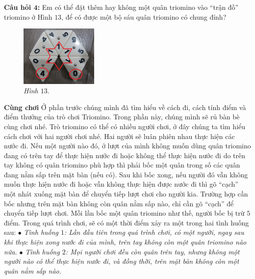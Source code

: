 {\begin{multicols}{2}
		\textbf{\color{toancuabi}Câu hỏi $\pmb{4}$:}
		\vskip 0.1cm
		Em có thể đặt thêm hay không một quân  triomino vào “trận đồ” triomino ở Hình $13$, để có được một bộ sáu quân \linebreak triomino có chung đỉnh?		\begin{figure}[H]
			\centering
			\captionsetup{labelformat=empty, justification=centering}
			\includegraphics[width=0.34\textwidth]{h13a}
			\caption{\textit{\small Hình $13.$}}
			\vspace*{-5pt}
		\end{figure}
	\end{multicols}
	{\textbf{\color{toancuabi}\color{toancuabi} {Cùng chơi}}   
	\vskip 0.1cm
	Ở phần trước chúng mình đã tìm hiểu về cách đi, cách tính điểm và điểm thưởng của trò chơi Triomino. Trong phần  này, chúng mình sẽ rủ bàn bè cùng chơi nhé.
	\vskip 0.1cm
	Trò triomino có thể có nhiều người chơi, ở đây chúng ta tìm hiểu cách chơi với hai người chơi nhé. Hai người sẽ luân phiên nhau thực hiện các nước đi.
	\vskip 0.1cm
	Nếu một người nào đó, ở lượt của mình không muốn dùng quân triomino đang có trên tay để thực hiện nước đi hoặc không thể thực hiện nước đi do trên tay không có quân triomino phù hợp thì phải bốc một quân trong số các quân đang nằm sấp trên mặt bàn (nếu có). Sau khi bốc xong, nếu người đó vẫn không muốn thực hiện nước đi hoặc vẫn không thực hiện được nước đi thì gõ “cạch” một nhát xuống mặt bàn để chuyển tiếp lượt chơi cho người kia. Trường hợp cần bốc nhưng trên mặt bàn không còn quân nằm sấp nào, chỉ cần gõ “cạch” để chuyển tiếp lượt chơi. Mỗi lần bốc một quân triomino như thế, người bốc bị trừ $5$ điểm.
	\vskip 0.1cm
	Trong quá trình chơi, sẽ có một thời điểm xảy ra một trong hai tình huống sau:
	\vskip 0.1cm
	$\bullet$ \textit{Tình huống $1$: Lần đầu tiên trong quá trình chơi, có một người, ngay sau khi thực hiện xong nước đi của mình, trên tay không còn một quân triomino nào nữa.}
	\vskip 0.1cm
	$\bullet$ \textit{Tình huống $2$: Mọi người chơi đều còn quân trên tay, nhưng không một người nào có thể thực hiện nước đi, và đồng thời, trên mặt bàn không còn một quân nằm sấp nào.}
	\vskip 0.1cm
}}
